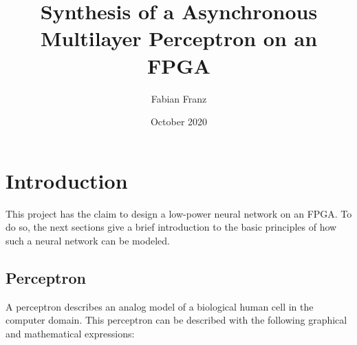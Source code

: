 \documentclass{article}
\title{Synthesis of a Asynchronous Multilayer Perceptron on an FPGA}
\author{Fabian Franz}
\date{October 2020}
\numberwithin{equation}{section}
\begin{document}
\maketitle

\pagebreak
\tableofcontents
\pagebreak

\section{Introduction}
This project has the claim to design a low-power neural network on an FPGA.
To do so, the next sections give a brief introduction to the basic
principles of how such a neural network can be modeled.

\subsection{Perceptron}
A perceptron describes an analog model of a biological human cell in the
computer domain. This perceptron can be described with the following graphical
and mathematical expressions:
\end{document}
